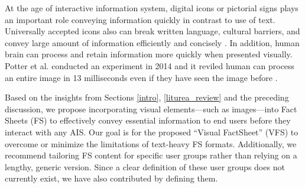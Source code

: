 \documentclass[manuscript,screen,review]{acmart}
\begin{document}
	At the age of interactive information system, digital icons or pictorial signs plays an important role conveying information quickly in contrast to use of text. Universally accepted icons also can break written language, cultural barriers, and convey large amount of information efficiently and concisely \cite{COLLAUD2022102290} \cite{doi:10.1177/2041669518780807} \cite{doi:10.1177/2041669518780807}. In addition, human brain can process and retain information more quickly when presented visually. Potter et al. conducted an experiment in 2014 and it reviled human can process an entire image in 13 milliseconds even if they have seen the image before \cite{Potter2014-ih}. 
	

	Based on the insights from Sections \ref{intro}, \ref{liturea_review} and the preceding discussion, we propose incorporating visual elements—such as images—into Fact Sheets (FS) to effectively convey essential information to end users before they interact with any AIS. Our goal is for the proposed \enquote{Visual FactSheet} (VFS) to overcome or minimize the limitations of text-heavy FS formats. Additionally, we recommend tailoring FS content for specific user groups rather than relying on a lengthy, generic version. Since a clear definition of these user groups does not currently exist, we have also contributed by defining them.


	
	
	
\end{document}
